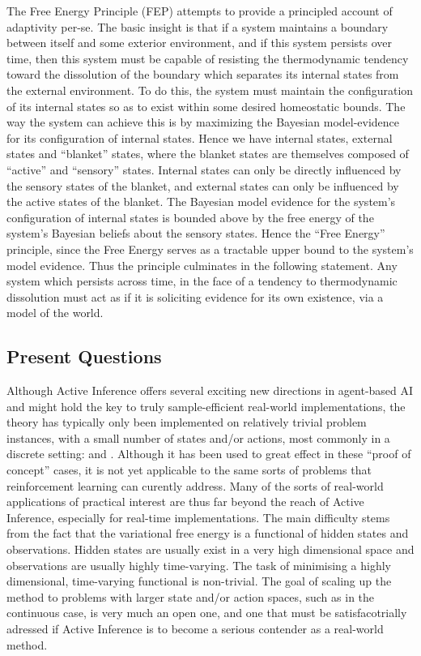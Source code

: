 \documentclass[onecolumn]{IEEEtran}
\begin{document}
The Free Energy Principle (FEP) attempts to provide a principled account of adaptivity per-se. The basic insight is that if a system maintains a boundary between itself and some exterior environment, and if this system persists over time, then this system must be capable of resisting the thermodynamic tendency toward the dissolution of the boundary which separates its internal states from the external environment. To do this, the system must maintain the configuration of its internal states so as to exist within some desired homeostatic bounds. The way the system can achieve this is by maximizing the Bayesian model-evidence for its configuration of internal states. Hence we have internal states, external states and ``blanket'' states, where the blanket states are themselves composed of ``active'' and ``sensory'' states. Internal states can only be directly influenced by the sensory states of the blanket, and external states can only be influenced by the active states of the blanket. The Bayesian model evidence for the system's configuration of internal states is bounded above by the free energy of the system's Bayesian beliefs about the sensory states. Hence the ``Free Energy'' principle, since the Free Energy serves as a tractable upper bound to the system's model evidence. Thus the principle culminates in the following statement. Any system which persists across time, in the face of a tendency to thermodynamic dissolution must act as if it is soliciting evidence for its own existence, via a model of the world.  

\subsection{Present Questions}

Although Active Inference offers several exciting new directions in agent-based AI and might hold the key to truly sample-efficient real-world implementations, the theory has typically only been implemented on relatively trivial problem instances, with a small number of states and/or actions, most commonly in a discrete setting: \textcite{Uncertainty_Epistemics_AIF_Saccad} and \textcite{AIF-Epistemic-Value}. Although it has been used to great effect in these ``proof of concept'' cases, it is not yet applicable to the same sorts of problems that reinforcement learning can curently address. Many of the sorts of real-world applications of practical interest are thus far beyond the reach of Active Inference, especially for real-time implementations. The main difficulty stems from the fact that the variational free energy is a functional of hidden states and observations. Hidden states are usually exist in a very high dimensional space and observations are usually highly time-varying. The task of minimising a highly dimensional, time-varying functional is non-trivial. The goal of scaling up the method to problems with larger state and/or action spaces, such as in the continuous case, is very much an open one, and one that must be satisfacotrially adressed if Active Inference is to become a serious contender as a real-world method.  
\end{document}

